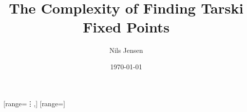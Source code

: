 \usepackage[english]{babel} %
\usepackage[english=british]{csquotes}	%

\usepackage{blindtext}

\usepackage{styling/kaobiblio}

\usepackage{math_styling/theorems}

\usepackage{styling/kaorefs}

\graphicspath{{images/}{./}} %

\makeindex[columns=3, title=Alphabetical Index, intoc]

\newcommand*{\newpartpage}[1]{
    \pagelayout{wide} %
    \addpart{#1}
    \pagelayout{margin} %
}

\usepackage{svg} %
\usepackage{afterpage} %
\usepackage{fontspec} %
\usepackage{math_styling/mathmacros} %
\usepackage{hyperref}
\usepackage{graphicx}
\usepackage{import}
\usepackage{xifthen}
\usepackage{pdfpages}
\usepackage{transparent}
\usepackage{textcomp} %
\usepackage{marvosym} %


\setmainfont[
    Ligatures=TeX,
    ItalicFont = Fira Sans Italic,
    BoldFont = Fira Sans Medium,
    BoldItalicFont = Fira Sans Medium Italic
]{Fira Sans Regular}
\setmonofont[Ligatures=TeX]{Fira Mono}

\usepackage{firamath-otf}
[range={\vdots,\ddots}] %
{}[range=]

\newcommand{\define}[1]{\textit{#1}\index{#1}}

\newcommand{\incfig}[1]{%
    \def\svgwidth{\textwidth}
    {#1.pdf_tex}
}



\title{The Complexity of Finding Tarski Fixed Points}
\author{Nils Jensen}
\date{\today}

